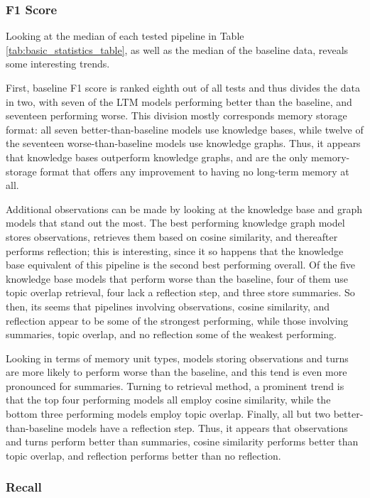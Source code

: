 \subsubsection{F1 Score}

Looking at the median of each tested pipeline in Table \ref{tab:basic_statistics_table}, as well as the median of the baseline data, reveals some interesting trends. 

First, baseline F1 score is ranked eighth out of all tests and thus divides the data in two, with seven of the LTM models performing better than the baseline, and seventeen performing worse. This division mostly corresponds memory storage format: all seven better-than-baseline models use knowledge bases, while twelve of the seventeen worse-than-baseline models use knowledge graphs. Thus, it appears that knowledge bases outperform knowledge graphs, and are the only memory-storage format that offers any improvement to having no long-term memory at all. 

Additional observations can be made by looking at the knowledge base and graph models that stand out the most. The best performing knowledge graph model stores observations, retrieves them based on cosine similarity, and thereafter performs reflection; this is interesting, since it so happens that the knowledge base equivalent of this pipeline is the second best performing overall. Of the five knowledge base models that perform worse than the baseline, four of them use topic overlap retrieval, four lack a reflection step, and three store summaries. So then, its seems that pipelines involving observations, cosine similarity, and reflection appear to be some of the strongest performing, while those involving summaries, topic overlap, and no reflection some of the weakest performing.

Looking in terms of memory unit types, models storing observations and turns are more likely to perform worse than the baseline, and this tend is even more pronounced for summaries. Turning to retrieval method, a prominent trend is that the top four performing models all employ cosine similarity, while the bottom three performing models employ topic overlap. Finally, all but two better-than-baseline models have a reflection step. Thus, it appears that observations and turns perform better than summaries, cosine similarity performs better than topic overlap, and reflection performs better than no reflection.


\subsubsection{Recall}


